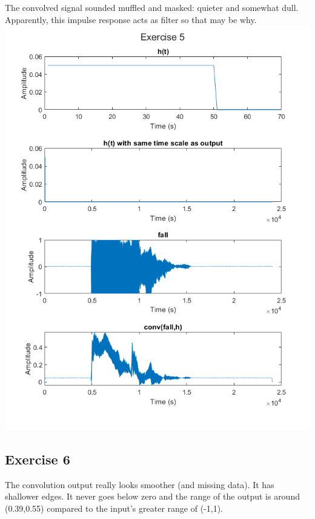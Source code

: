 \documentclass[11pt]{article}
\begin{document}
The convolved signal sounded muffled and masked: quieter and somewhat dull.
Apparently, this impulse response acts as filter so that may be why.\\



\includegraphics[width=\textwidth]{exercise5.png}

\pagebreak
\subsection{Exercise 6}

The convolution output really looks smoother (and missing data).
It has shallower edges.
It never goes below zero and the range of the output is around (0.39,0.55) compared to the input's greater range of (-1,1).\\


\end{document}

